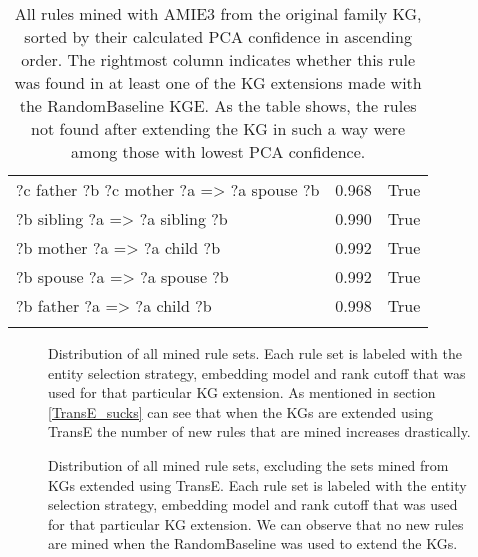 \begin{longtable}{lrl}
      ?c  father  ?b  ?c  mother  ?a   => ?a  spouse  ?b &           0.968 &                     True \\
                    ?b  sibling  ?a   => ?a  sibling  ?b &           0.990 &                     True \\
                       ?b  mother  ?a   => ?a  child  ?b &           0.992 &                     True \\
                      ?b  spouse  ?a   => ?a  spouse  ?b &           0.992 &                     True \\
                       ?b  father  ?a   => ?a  child  ?b &           0.998 &                     True \\
\bottomrule
\caption{All rules mined with AMIE3 from the original family KG, sorted by their calculated PCA confidence in ascending order. The rightmost column indicates whether this rule was found in at least one of the KG extensions made with the RandomBaseline KGE. As the table shows, the rules not found after extending the KG in such a way were among those with lowest PCA confidence.}
\label{original_rules_found_by_baseline_family}
\end{longtable}


\begin{figure}[htbp]
\centering
    \centering
    
    \caption[Dist. of all sets of mined rules.]{Distribution of all mined rule sets. Each rule set is labeled with the entity selection strategy, embedding model and rank cutoff that was used for that particular KG extension. As mentioned in section \ref{TransE_sucks} can see that when the KGs are extended using TransE the number of new rules that are mined increases drastically.}
    \label{all_sets}
\end{figure}


\begin{figure}[htbp]
\centering
    \centering
    
    \caption[Dist. of all sets of mined rules, excluding TransE.]{Distribution of all mined rule sets, excluding the sets mined from KGs extended using TransE. Each rule set is labeled with the entity selection strategy, embedding model and rank cutoff that was used for that particular KG extension. We can observe that no new rules are mined when the RandomBaseline was used to extend the KGs.}
    \label{all_sets_w_out_TransE}
\end{figure}



